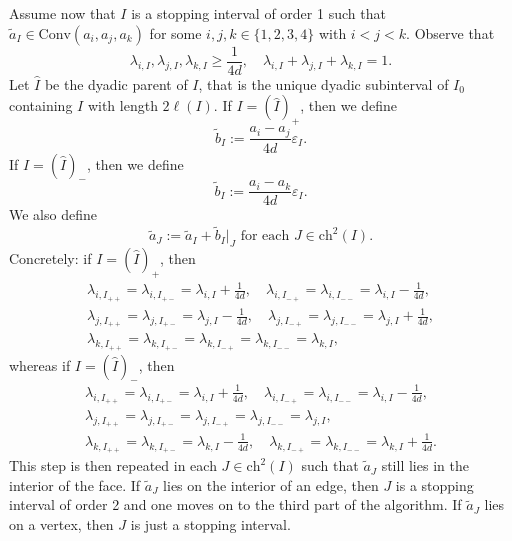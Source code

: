 \documentclass{amsart}
\newcommand{\wt}{\widetilde}
\theoremstyle{definition}
\theoremstyle{remark}
\begin{document}
Assume now that $I$ is a stopping interval of order 1 such that $\wt{a}_{I}\in\mathrm{Conv}(a_i,a_j,a_k)$ for some $i,j,k\in\{1,2,3,4\}$ with $i<j<k$. Observe that
\begin{equation}
    \label{eq:barycentric_coordinates_inside_face}
    \lambda_{i,I},\lambda_{j,I},\lambda_{k,I}\geq\frac{1}{4d},\quad \lambda_{i,I}+\lambda_{j,I}+\lambda_{k,I}=1.
\end{equation}
Let $\hat{I}$ be the dyadic parent of $I$, that is the unique dyadic subinterval of $I_0$ containing $I$ with length $2\ell(I)$. If $I=(\hat{I})_{+}$, then we define
\begin{equation*}
    \wt{b}_{I}:=\frac{a_i-a_j}{4d}\varepsilon_{I}.
\end{equation*}
If $I=(\hat{I})_{-}$, then we define
\begin{equation*}
    \wt{b}_{I}:=\frac{a_i-a_k}{4d}\varepsilon_{I}.
\end{equation*}
We also define
\begin{equation*}
    \wt{a}_{J}:=\wt{a}_{I}+\wt{b}_{I}|_{J}\text{ for each }J\in\mathrm{ch}^2(I).
\end{equation*}
Concretely: if $I=(\hat{I})_{+}$, then
\begin{gather*}
    \lambda_{i,I_{++}}=\lambda_{i,I_{+-}}=\lambda_{i,I}+\frac{1}{4d},\quad \lambda_{i,I_{-+}}=\lambda_{i,I_{--}}=\lambda_{i,I}-\frac{1}{4d},\\
    \lambda_{j,I_{++}}=\lambda_{j,I_{+-}}=\lambda_{j,I}-\frac{1}{4d},\quad
    \lambda_{j,I_{-+}}=\lambda_{j,I_{--}}=\lambda_{j,I}+\frac{1}{4d},\\
    \lambda_{k,I_{++}}=\lambda_{k,I_{+-}}=
    \lambda_{k,I_{-+}}=\lambda_{k,I_{--}}=\lambda_{k,I},
\end{gather*}
whereas if $I=(\hat{I})_{-}$, then
\begin{gather*}
    \lambda_{i,I_{++}}=\lambda_{i,I_{+-}}=\lambda_{i,I}+\frac{1}{4d},\quad
    \lambda_{i,I_{-+}}=\lambda_{i,I_{--}}=\lambda_{i,I}-\frac{1}{4d},\\
    \lambda_{j,I_{++}}=\lambda_{j,I_{+-}}=
    \lambda_{j,I_{-+}}=\lambda_{j,I_{--}}=\lambda_{j,I},\\
    \lambda_{k,I_{++}}=\lambda_{k,I_{+-}}=\lambda_{k,I}-\frac{1}{4d},\quad
    \lambda_{k,I_{-+}}=\lambda_{k,I_{--}}=\lambda_{k,I}+\frac{1}{4d}.
\end{gather*}
This step is then repeated in each $J\in\mathrm{ch}^2(I)$ such that $\wt{a}_{J}$ still lies in the interior of the face. If $\wt{a}_{J}$ lies on the interior of an edge, then $J$ is a stopping interval of order 2 and one moves on to the third part of the algorithm. If $\wt{a}_{J}$ lies on a vertex, then $J$ is just a stopping interval.
\end{document}
